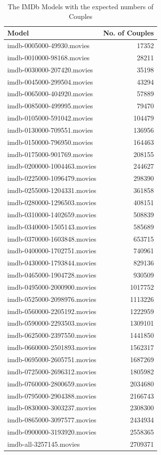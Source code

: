 \documentclass[a4paper]{article}
\begin{document}
\begin{table}[h!]
  \centering
  \begin{tabular}{| l | r |}
  \hline
  \textbf{Model}              & \textbf{No. of Couples}\\
  \hline
  imdb-0005000-49930.movies   & 17352\\
  imdb-0010000-98168.movies   & 28211\\
  imdb-0030000-207420.movies  & 35198\\
  imdb-0045000-299504.movies  & 43294\\
  imdb-0065000-404920.movies  & 57889\\
  imdb-0085000-499995.movies  & 79470\\
  imdb-0105000-591042.movies  & 104479\\
  imdb-0130000-709551.movies  & 136956\\
  imdb-0150000-796950.movies  & 164463\\
  imdb-0175000-901769.movies  & 208155\\
  imdb-0200000-1004463.movies & 244627\\
  imdb-0225000-1096479.movies & 298390\\
  imdb-0255000-1204331.movies & 361858\\
  imdb-0280000-1296503.movies & 408151\\
  imdb-0310000-1402659.movies & 508839\\
  imdb-0340000-1505143.movies & 585689\\
  imdb-0370000-1603848.movies & 653715\\
  imdb-0400000-1702751.movies & 740961\\
  imdb-0430000-1793844.movies & 829136\\
  imdb-0465000-1904728.movies & 930509\\
  imdb-0495000-2000900.movies & 1017752\\
  imdb-0525000-2098976.movies & 1113226\\
  imdb-0560000-2205192.movies & 1222959\\
  imdb-0590000-2293503.movies & 1309101\\
  imdb-0625000-2397550.movies & 1441850\\
  imdb-0660000-2501893.movies & 1562317\\
  imdb-0695000-2605751.movies & 1687269\\
  imdb-0725000-2696312.movies & 1805982\\
  imdb-0760000-2800659.movies & 2034680\\
  imdb-0795000-2904388.movies & 2166743\\
  imdb-0830000-3003237.movies & 2308300\\
  imdb-0865000-3097577.movies & 2434934\\
  imdb-0900000-3193920.movies & 2558365\\
  imdb-all-3257145.movies     & 2709371\\
  \hline
\end{tabular}
\caption{The IMDb Models with the expected numbers of Couples}
\label{tab:imdb-no-couples}
\end{table}
\end{document}
